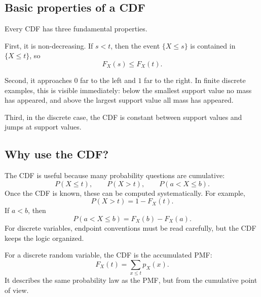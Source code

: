 \subsection*{Basic properties of a CDF}

Every CDF has three fundamental properties.

First, it is non-decreasing. If \(s<t\), then the event \(\{X\leq s\}\) is
contained in \(\{X\leq t\}\), so
\[
F_X(s)\leq F_X(t).
\]

Second, it approaches \(0\) far to the left and \(1\) far to the right. In finite
discrete examples, this is visible immediately: below the smallest support value
no mass has appeared, and above the largest support value all mass has appeared.

Third, in the discrete case, the CDF is constant between support values and jumps
at support values.

\subsection*{Why use the CDF?}

The CDF is useful because many probability questions are cumulative:
\[
P(X\leq t),\qquad P(X>t),\qquad P(a<X\leq b).
\]
Once the CDF is known, these can be computed systematically. For example,
\[
P(X>t)=1-F_X(t).
\]
If \(a<b\), then
\[
P(a<X\leq b)=F_X(b)-F_X(a).
\]
For discrete variables, endpoint conventions must be read carefully, but the CDF
keeps the logic organized.

\begin{theorembox}
For a discrete random variable, the CDF is the accumulated PMF:
\[
F_X(t)=\sum_{x\leq t}p_X(x).
\]
It describes the same probability law as the PMF, but from the cumulative point
of view.
\end{theorembox}
